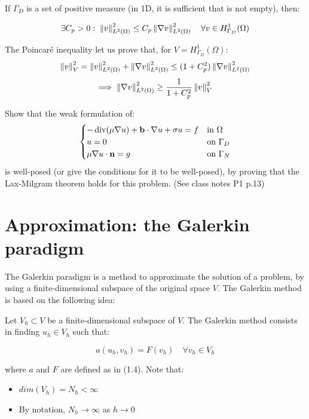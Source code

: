 \begin{ftheorem}
    If $\Gamma_D$ is a set of positive measure (in 1D, it is sufficient that is not empty), then:

    $$\exists C_p > 0: \; \left\|v\right\|_{L^2(\Omega)}^2 \leq C_p \left\|\nabla v\right\|^2_{L^2(\Omega)} \quad \forall v \in H_{\Gamma_D}^1(\Omega)$$

\end{ftheorem}

\begin{remark}
    The Poincaré inequality let us prove that, for $V = H_{\Gamma_D}^1(\Omega)$:
    $$\left\|v\right\|_V^2 = \left\|v\right\|_{L^2(\Omega)}^2 + \left\|\nabla v\right\|_{L^2(\Omega)}^2 \leq (1 + C_p^2) \left\|\nabla v\right\|_{L^2(\Omega)}^2$$
    $$\Longrightarrow \; \left\|\nabla v\right\|_{L^2(\Omega)}^2 \geq \frac{1}{1 + C_p^2} \left\|v\right\|_V^2$$
\end{remark}


\begin{fexercise}
    Show that the weak formulation of:
    $$\begin{cases}
        -\operatorname{div}(\mu \nabla u) + \mathbf{b} \cdot \nabla u + \sigma u = f & \text{in } \Omega \\
        u = 0 & \text{on }\Gamma_D \\
        \mu \nabla u \cdot \mathbf{n} = g & \text{on }\Gamma_N
    \end{cases}$$
    is well-posed (or give the conditions for it to be well-posed), by proving that the Lax-Milgram 
    theorem holds for this problem. (See class notes P1 p.13)
\end{fexercise}

\section{Approximation: the Galerkin paradigm}

The Galerkin paradigm is a method to approximate the solution of a problem, by using a finite-dimensional subspace 
of the original space $V$. The Galerkin method is based on the following idea:

\begin{fdefinition}
    Let $V_h \subset V$ be a finite-dimensional subspace of $V$. The Galerkin method consists in finding 
    $u_h \in V_h$ such that:

    $$a(u_h, v_h) = F(v_h) \quad \forall v_h \in V_h$$

    where $a$ and $F$ are defined as in (1.4). Note that:
    \vspace{1em}
    \begin{itemize}
        \item $dim(V_h) = N_h < \infty$
        \vspace{1em}
        \item By notation, $N_h \to \infty$ as $h \to 0$
    \end{itemize}
    
\end{fdefinition}

